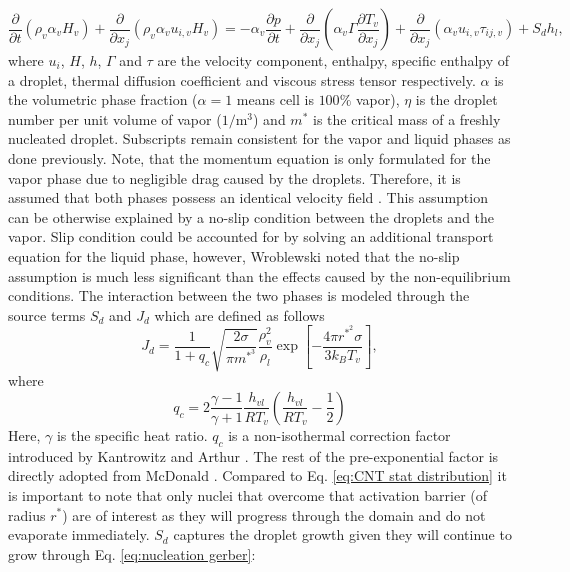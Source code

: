 \documentclass[12pt]{article}
\numberwithin{equation}{section}
\begin{document}
 \begin{equation}
    \frac{\partial}{\partial t}(\rho_{v}\alpha_{v}H_{v})+\frac{\partial}{\partial x_{j}}(\rho_{v}\alpha_{v}u_{i,v}H_{v}) =-\alpha_{v}\frac{\partial p}{\partial t}+\frac{\partial}{\partial x_{j}}(\alpha_{v}\Gamma\frac{\partial T_{v}}{\partial x_{j}})+\frac{\partial}{\partial x_{j}}(\alpha_{v}u_{i,v}\tau_{ij,v}) + S_{d}h_{l}, 
    \label{eq:v_energy}
\end{equation}
where $u_{i}$, $H$, $h$, $\Gamma$ and $\tau$ are the velocity component, enthalpy, specific enthalpy of a droplet, thermal diffusion coefficient and viscous stress tensor respectively. $\alpha$ is the volumetric phase fraction ($\alpha=1$ means cell is $100\%$ vapor), $\eta$ is the droplet number per unit volume of vapor ($1/\mathrm{m}^{3}$) and $m^{*}$ is the critical mass of a freshly nucleated droplet. Subscripts remain consistent for the vapor and liquid phases as done previously. Note, that the momentum equation is only formulated for the vapor phase due to negligible drag caused by the droplets. Therefore, it is assumed that both phases possess an identical velocity field \cite{patel2016influence}. This assumption can be otherwise explained by a no-slip condition between the droplets and the vapor. Slip condition could be accounted for by solving an additional transport equation for the liquid phase, however, Wroblewski \cite{wroblewski2009numerical} noted that the no-slip assumption is much less significant than the effects caused by the non-equilibrium conditions. The interaction between the two phases is modeled through the source terms $S_{d}$ and $J_{d}$ which are defined as follows
\begin{equation}
    J_{d}=\frac{1}{1+q_{c}}\sqrt{\frac{2\sigma}{\pi m^{*^{3}}}}\frac{\rho_{v}^{2}}{\rho_{l}}\exp\left[-\frac{4\pi r^{*^{2}}\sigma}{3k_{B}T_{v}}\right],
    \label{eq:nucleation gerber}
\end{equation}
where
\begin{equation}
    q_{c}=2\frac{\gamma-1}{\gamma+1}\frac{h_{vl}}{RT_{v}}\left(\frac{h_{vl}}{RT_{v}}-\frac{1}{2}\right)
    \label{eq:nucleation gerber theta}
\end{equation}
Here, $\gamma$ is the specific heat ratio. $q_{c}$ is a non-isothermal correction factor introduced by Kantrowitz and Arthur \cite{kantrowitz1951nucleation}. The rest of the pre-exponential factor is directly adopted from McDonald \cite{mcdonald1962homogeneous}. Compared to Eq. \ref{eq:CNT stat distribution} it is important to note that only nuclei that overcome that activation barrier (of radius $r^{*}$) are of interest as they will progress through the domain and do not evaporate immediately. $S_{d}$ captures the droplet growth given they will continue to grow through Eq. \ref{eq:nucleation gerber}:
\end{document}

